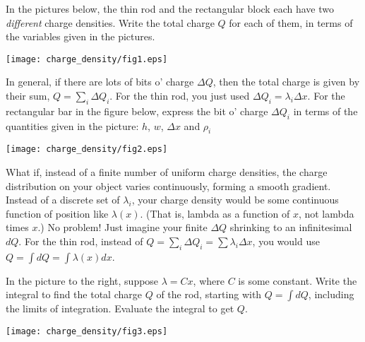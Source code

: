 \begin{enumerate}[labparts]
\item In the pictures below, the thin rod and the rectangular block each have two \textit{different} charge densities.  Write the total charge $Q$ for each of them, in terms of the variables given in the pictures.
\begin{center}
\texttt{[image: charge\_density/fig1.eps]}
\end{center}

\item In general, if there are lots of bits o' charge $\Delta Q$, then the total charge is given by their sum, $Q = \sum_i \Delta Q_i$. For the thin rod, you just used $\Delta Q_i = \lambda_i \Delta x$.  For the rectangular bar in the figure below, express the bit o' charge $\Delta Q_i$ in terms of the quantities given in the picture: $h$, $w$, $\Delta x$ and $\rho_i$

\vspace{-0.4 in}
\begin{center}
\texttt{[image: charge\_density/fig2.eps]}
\vspace{-0.2in}
\end{center}
What if, instead of a finite number of uniform charge densities, the charge distribution on your object varies continuously, forming a smooth gradient. Instead of a discrete set of $\lambda_i$, your charge density would be some continuous function of position like $\lambda(x)$.  (That is, lambda as a function of $x$, not lambda times $x$.) No problem! Just imagine your finite $\Delta Q$ shrinking to an infinitesimal $dQ$.  For the thin rod, instead of $Q= \sum_i \Delta Q_i = \sum \lambda_i \Delta x$, you would use $Q = \int dQ = \int \lambda \left(x\right) dx$. 

\vspace{-0.1in}
\begin{minipage}{0.54\textwidth}
\item In the picture to the right, suppose $\lambda = Cx$, where $C$ is some constant. Write the integral to find the total charge $Q$ of the rod, starting with $Q = \int dQ$, including the limits of integration.  Evaluate the integral to get $Q$.
\end{minipage}
\begin{minipage}{0.45\textwidth}
    \hspace{0.25in}\texttt{[image: charge\_density/fig3.eps]}
\end{minipage}
\answerspace{0.4 in}



\end{enumerate}
